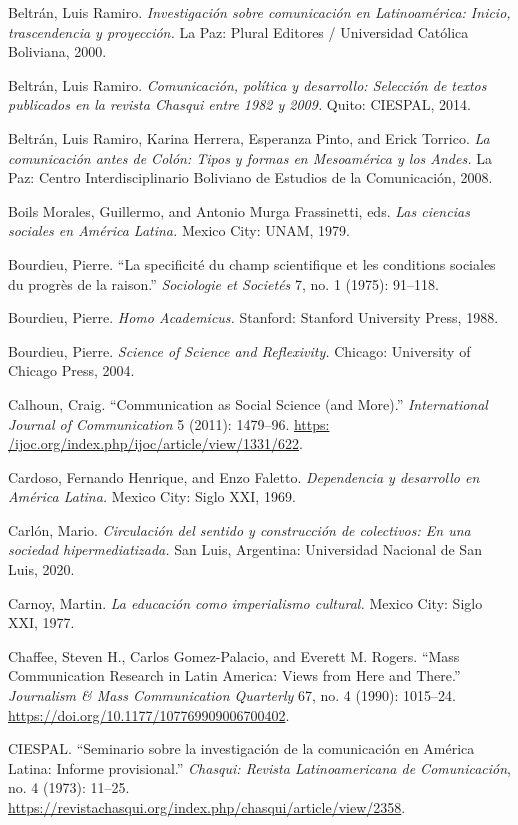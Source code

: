 \documentclass{tufte-handout}
\begin{document}
\begin{hangparas}{.25in}{1}
Beltrán, Luis Ramiro. \emph{Investigación sobre comunicación en
Latinoamérica: Inicio, trascendencia y proyección.} La Paz: Plural
Editores / Universidad Católica Boliviana, 2000.

Beltrán, Luis Ramiro. \emph{Comunicación, política y desarrollo:
Selección de textos publicados en la revista Chasqui entre 1982 y 2009.}
Quito: CIESPAL, 2014.

Beltrán, Luis Ramiro, Karina Herrera, Esperanza Pinto, and Erick
Torrico. \emph{La comunicación antes de Colón: Tipos y formas en
Mesoamérica y los Andes.} La Paz: Centro Interdisciplinario Boliviano de
Estudios de la Comunicación, 2008.

Boils Morales, Guillermo, and Antonio Murga Frassinetti, eds. \emph{Las
ciencias sociales en América Latina.} Mexico City: UNAM, 1979.

Bourdieu, Pierre. ``La specificité du champ scientifique et les
conditions sociales du progrès de la raison.'' \emph{Sociologie et
Societés} 7, no. 1 (1975): 91--118.

Bourdieu, Pierre. \emph{Homo Academicus.} Stanford: Stanford University
Press, 1988.

Bourdieu, Pierre. \emph{Science of Science and Reflexivity.} Chicago:
University of Chicago Press, 2004.

Calhoun, Craig. ``Communication as Social Science (and More).''
\emph{International Journal of Communication} 5 (2011): 1479--96.
\href{https://ijoc.org/index.php/ijoc/article/view/1331/622}{https:
/ijoc.org/index.php/ijoc/article/view/1331/622}.

Cardoso, Fernando Henrique, and Enzo Faletto. \emph{Dependencia y
desarrollo en América Latina.} Mexico City: Siglo XXI, 1969.

Carlón, Mario. \emph{Circulación del sentido y construcción de
colectivos: En una sociedad hipermediatizada.} San Luis, Argentina:
Universidad Nacional de San Luis, 2020.

Carnoy, Martin. \emph{La educación como imperialismo cultural.} Mexico
City: Siglo XXI, 1977.

Chaffee, Steven H., Carlos Gomez-Palacio, and Everett M. Rogers. ``Mass
Communication Research in Latin America: Views from Here and There.''
\emph{Journalism \& Mass Communication Quarterly} 67, no. 4 (1990):
1015--24. \url{https://doi.org/10.1177/107769909006700402}.

CIESPAL. ``Seminario sobre la investigación de la comunicación en
América Latina: Informe provisional.'' \emph{Chasqui: Revista
Latinoamericana de Comunicación}, no. 4 (1973): 11--25.
\url{https://revistachasqui.org/index.php/chasqui/article/view/2358}.


\end{hangparas}
\end{document}

